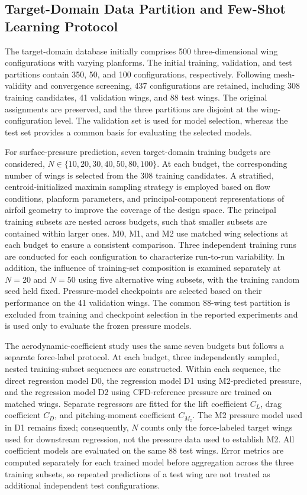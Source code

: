 
\subsection{Target-Domain Data Partition and Few-Shot Learning Protocol}
\label{subsec:target-domain-protocol}

The target-domain database initially comprises 500 three-dimensional wing configurations with varying planforms. The initial training, validation, and test partitions contain 350, 50, and 100 configurations, respectively. Following mesh-validity and convergence screening, 437 configurations are retained, including 308 training candidates, 41 validation wings, and 88 test wings. The original assignments are preserved, and the three partitions are disjoint at the wing-configuration level. The validation set is used for model selection, whereas the test set provides a common basis for evaluating the selected models.

For surface-pressure prediction, seven target-domain training budgets are considered, $N\in\{10,20,30,40,50,80,100\}$. At each budget, the corresponding number of wings is selected from the 308 training candidates. A stratified, centroid-initialized maximin sampling strategy is employed based on flow conditions, planform parameters, and principal-component representations of airfoil geometry to improve the coverage of the design space. The principal training subsets are nested across budgets, such that smaller subsets are contained within larger ones. M0, M1, and M2 use matched wing selections at each budget to ensure a consistent comparison. Three independent training runs are conducted for each configuration to characterize run-to-run variability. In addition, the influence of training-set composition is examined separately at $N=20$ and $N=50$ using five alternative wing subsets, with the training random seed held fixed. Pressure-model checkpoints are selected based on their performance on the 41 validation wings. The common 88-wing test partition is excluded from training and checkpoint selection in the reported experiments and is used only to evaluate the frozen pressure models.

The aerodynamic-coefficient study uses the same seven budgets but follows a separate force-label protocol. At each budget, three independently sampled, nested training-subset sequences are constructed. Within each sequence, the direct regression model D0, the regression model D1 using M2-predicted pressure, and the regression model D2 using CFD-reference pressure are trained on matched wings. Separate regressors are fitted for the lift coefficient $C_L$, drag coefficient $C_D$, and pitching-moment coefficient $C_{M_z}$. The M2 pressure model used in D1 remains fixed; consequently, $N$ counts only the force-labeled target wings used for downstream regression, not the pressure data used to establish M2. All coefficient models are evaluated on the same 88 test wings. Error metrics are computed separately for each trained model before aggregation across the three training subsets, so repeated predictions of a test wing are not treated as additional independent test configurations.

